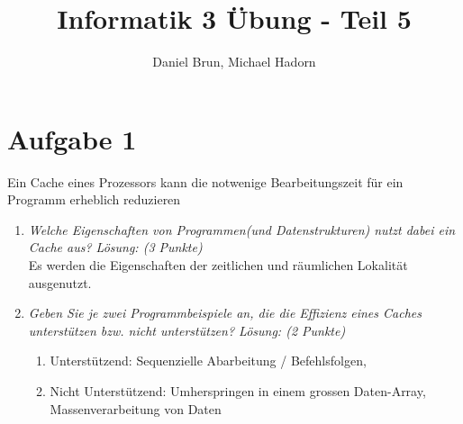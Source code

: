 \documentclass[10pt]{article}
\title{Informatik 3 Übung - Teil 5\vspace{-2ex}}
\author{Daniel Brun, Michael Hadorn\vspace{-2ex}}
\begin{document}
\maketitle

\section*{Aufgabe 1}
Ein Cache eines Prozessors kann die notwenige Bearbeitungszeit für ein Programm erheblich reduzieren
\begin{enumerate}[label=\alph*)]
	\item
		\textit{Welche Eigenschaften von Programmen(und Datenstrukturen) nutzt dabei ein Cache aus? Lösung: (3 Punkte)}\\
		Es werden die Eigenschaften der zeitlichen und räumlichen Lokalität ausgenutzt.
		
		\item 
		\textit{Geben Sie je zwei Programmbeispiele an, die die Effizienz eines Caches unterstützen bzw. nicht unterstützen? Lösung: (2 Punkte)}\\
		\begin{enumerate}
			\item Unterstützend:
				Sequenzielle Abarbeitung / Befehlsfolgen, 
			\item Nicht Unterstützend:
				Umherspringen in einem grossen Daten-Array, 
				Massenverarbeitung von Daten
		\end{enumerate}
\end{enumerate}

\newpage

\end{document}
